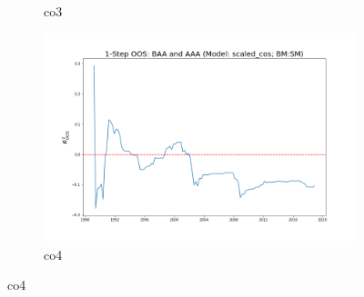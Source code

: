 \documentclass[a4paper,12pt,times,numbered,print,index]{report}
\numberwithin{equation}{section}
\begin{document}
\begin{figure}[!htbp]
\begin{subfigure}[b]{0.42\linewidth}
		\caption{co3}
	\end{subfigure}
	\begin{subfigure}[b]{0.42\linewidth}
		\includegraphics[width=0.9\linewidth]{OOS_plots/scaled_cos_co4_SM.png}
		\caption{co4}
	\end{subfigure}
	\label{g4}
\end{figure}
\end{document}

